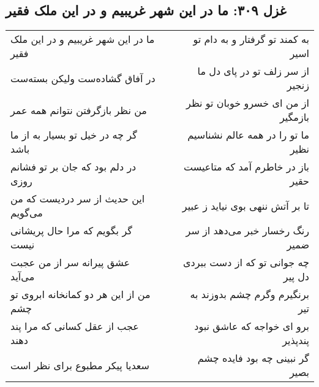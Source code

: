 \begin{center}
\section*{غزل ۳۰۹: ما در این شهر غریبیم و در این ملک فقیر}
\label{sec:309}
\begin{longtable}{l p{0.5cm} r}
ما در این شهر غریبیم و در این ملک فقیر
&&
به کمند تو گرفتار و به دام تو اسیر
\\
در آفاق گشاده‌ست ولیکن بسته‌ست
&&
از سر زلف تو در پای دل ما زنجیر
\\
من نظر بازگرفتن نتوانم همه عمر
&&
از من ای خسرو خوبان تو نظر بازمگیر
\\
گر چه در خیل تو بسیار به از ما باشد
&&
ما تو را در همه عالم نشناسیم نظیر
\\
در دلم بود که جان بر تو فشانم روزی
&&
باز در خاطرم آمد که متاعیست حقیر
\\
این حدیث از سر دردیست که من می‌گویم
&&
تا بر آتش ننهی بوی نیاید ز عبیر
\\
گر بگویم که مرا حال پریشانی نیست
&&
رنگ رخسار خبر می‌دهد از سر ضمیر
\\
عشق پیرانه سر از من عجبت می‌آید
&&
چه جوانی تو که از دست ببردی دل پیر
\\
من از این هر دو کمانخانه ابروی تو چشم
&&
برنگیرم وگرم چشم بدوزند به تیر
\\
عجب از عقل کسانی که مرا پند دهند
&&
برو ای خواجه که عاشق نبود پندپذیر
\\
سعدیا پیکر مطبوع برای نظر است
&&
گر نبینی چه بود فایده چشم بصیر
\\
\end{longtable}
\end{center}
